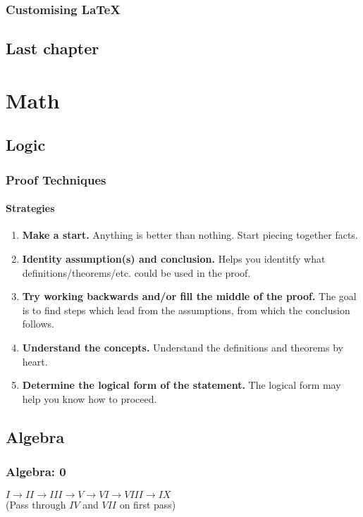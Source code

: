 \documentclass[openany]{book}
\begin{document}
\section{Customising \LaTeX}


\chapter{Last chapter}

\part{Math}
\chapter{Logic}
\section{Proof Techniques}
\subsection{Strategies}
\begin{enumerate}
    \item \textbf{Make a start.} Anything is better than nothing. Start piecing together facts.
    \item \textbf{Identity assumption(s) and conclusion.} Helps you identitfy what definitions/theorems/etc. could be used in the proof.
    \item \textbf{Try working backwards and/or fill the middle of the proof.} The goal is to find steps which lead from the assumptions, from which the conclusion follows.
    \item \textbf{Understand the concepts.} Understand the definitions and theorems by heart.
    \item \textbf{Determine the logical form of the statement.} The logical form may help you know how to proceed.
\end{enumerate}

\chapter{Algebra}
\section{Algebra: 0}
$I \rightarrow II \rightarrow III \rightarrow V \rightarrow VI \rightarrow VIII \rightarrow IX$
\\ (Pass through $IV$ and $VII$ on first pass)
\end{document}

